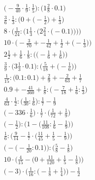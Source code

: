 \documentclass[8pt]{article}
\begin{document}
\begin{align}
\big(-\frac{9}{40} \cdot \frac{1}{9} : \frac{1}{5}\big) : \big(1\frac{2}{8} \cdot 0.1\big) \\
\frac{3}{6} \cdot \frac{1}{3} : \Big(0 + \big(-\frac{1}{2}\big) + \frac{1}{3}\Big) \\
8 \cdot \Bigg(\frac{1}{24} : \bigg(1\frac{1}{3} \cdot \Big(2\frac{2}{4} \cdot \big(-0.1\big)\Big)\bigg)\Bigg) \\
10 \cdot \Big(-\frac{3}{70} + -\frac{1}{42} + \frac{1}{2} + \big(-\frac{1}{3}\big)\Big) \\
2\frac{1}{2} + \frac{1}{6} \cdot \frac{1}{8} : \Big(\big(-\frac{1}{6} + \frac{1}{6}\big)\Big) \\
\frac{3}{9} \cdot \Big(3\frac{1}{3} \cdot 0.1\Big) : \Big(\frac{5}{18} + \big(-\frac{1}{6}\big)\Big) \\
\frac{1}{15} : \big(0.1 : 0.1\big) + \frac{2}{9} + -\frac{2}{63} + \frac{1}{7} \\
0.9 + -\frac{41}{360} + \frac{1}{8} : \big(-\frac{7}{18} + \frac{1}{6} : \frac{1}{3}\big) \\
\frac{4}{63} \cdot \frac{1}{2} : \big(\frac{1}{30} : \frac{1}{6}\big) : \frac{1}{7} - \frac{1}{9} \\
\big(-336 \cdot \frac{1}{6}\big) \cdot \frac{1}{7} \cdot \big(\frac{1}{72} + \frac{1}{9}\big) \\
\Big(-\frac{1}{2}\Big) : \Big(1 - \big(\frac{11}{108} : \frac{1}{6} - \frac{1}{9}\big)\Big) \\
\frac{1}{6} : \Big(\frac{9}{14} - \frac{1}{7} \cdot \big(\frac{11}{45} + \frac{1}{5} - \frac{1}{9}\big)\Big) \\
\Big(-\big(-\frac{1}{20} : 0.1\big)\Big) : \Big(\frac{5}{8} - \frac{1}{8}\Big) \\
10 \cdot \Big(\frac{4}{15} - \big(0 + \frac{11}{120} + \frac{1}{5} - \frac{1}{8}\big)\Big) \\
\Big(-3\Big) \cdot \Big(\frac{1}{16} : \big(-\frac{1}{8} + \frac{1}{4}\big)\Big) - \frac{1}{2}
\end{align}
\end{document}
